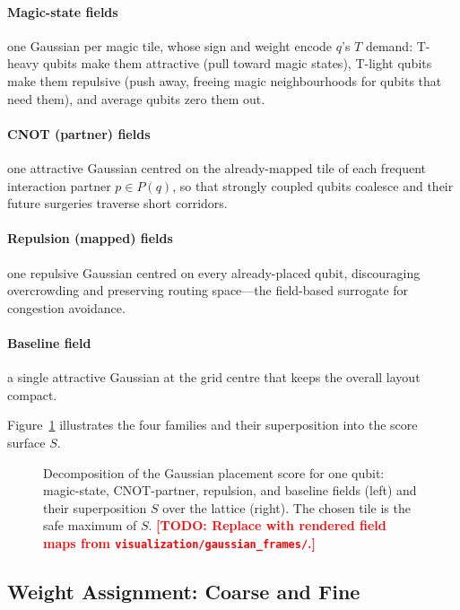\documentclass[10pt,conference]{IEEEtran}
\theoremstyle{definition}
\theoremstyle{remark}
\newcommand{\todo}[1]{\textcolor{red}{\textbf{[TODO: #1]}}}
\newcommand{\figslot}[2][0.95\linewidth]{%
    \setlength{\fboxsep}{0pt}%
    \fbox{\parbox[c][#2][c]{#1}{\centering\footnotesize\itshape
        \textcolor{gray}{[ figure placeholder — #1 wide ]}}}%
}
\begin{document}
\paragraph{Magic-state fields}
one Gaussian per magic tile, whose sign and weight encode $q$'s $T$ demand:
T-heavy qubits make them attractive (pull toward magic states), T-light qubits
make them repulsive (push away, freeing magic neighbourhoods for qubits that
need them), and average qubits zero them out.

\paragraph{CNOT (partner) fields}
one attractive Gaussian centred on the already-mapped tile of each frequent
interaction partner $p\in P(q)$, so that strongly coupled qubits coalesce and
their future surgeries traverse short corridors.

\paragraph{Repulsion (mapped) fields}
one repulsive Gaussian centred on every already-placed qubit, discouraging
overcrowding and preserving routing space---the field-based surrogate for
congestion avoidance.

\paragraph{Baseline field}
a single attractive Gaussian at the grid centre that keeps the overall layout
compact.

Figure~\ref{fig:fields} illustrates the four families and their superposition
into the score surface $S$.

\begin{figure}[t]
    \centering
    \figslot{1.5in}
    \caption{Decomposition of the Gaussian placement score for one qubit:
    magic-state, CNOT-partner, repulsion, and baseline fields (left) and their
    superposition $S$ over the lattice (right). The chosen tile is the safe
    maximum of $S$. \todo{Replace with rendered field maps from
    \texttt{visualization/gaussian\_frames/}.}}
    \label{fig:fields}
\end{figure}

\subsection{Weight Assignment: Coarse and Fine}
\end{document}
